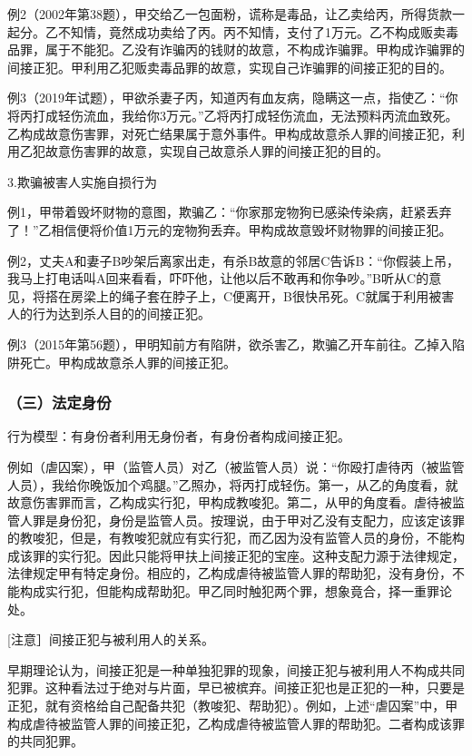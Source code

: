 例2（2002年第38题），甲交给乙一包面粉，谎称是毒品，让乙卖给丙，所得货款一起分。乙不知情，竟然成功卖给了丙。丙不知情，支付了1万元。乙不构成贩卖毒品罪，属于不能犯。乙没有诈骗丙的钱财的故意，不构成诈骗罪。甲构成诈骗罪的间接正犯。甲利用乙犯贩卖毒品罪的故意，实现自己诈骗罪的间接正犯的目的。

例3（2019年试题），甲欲杀妻子丙，知道丙有血友病，隐瞒这一点，指使乙：“你将丙打成轻伤流血，我给你3万元。”乙将丙打成轻伤流血，无法预料丙流血致死。乙构成故意伤害罪，对死亡结果属于意外事件。甲构成故意杀人罪的间接正犯，利用乙犯故意伤害罪的故意，实现自己故意杀人罪的间接正犯的目的。

3.欺骗被害人实施自损行为

例1，甲带着毁坏财物的意图，欺骗乙：“你家那宠物狗已感染传染病，赶紧丢弃了！”乙相信便将价值1万元的宠物狗丢弃。甲构成故意毁坏财物罪的间接正犯。

例2，丈夫A和妻子B吵架后离家出走，有杀B故意的邻居C告诉B：“你假装上吊，我马上打电话叫A回来看看，吓吓他，让他以后不敢再和你争吵。”B听从C的意见，将搭在房梁上的绳子套在脖子上，C便离开，B很快吊死。C就属于利用被害人的行为达到杀人目的的间接正犯。

例3（2015年第56题），甲明知前方有陷阱，欲杀害乙，欺骗乙开车前往。乙掉入陷阱死亡。甲构成故意杀人罪的间接正犯。

\subsubsection*{（三）法定身份}

行为模型：有身份者利用无身份者，有身份者构成间接正犯。

例如（虐囚案），甲（监管人员）对乙（被监管人员）说：“你殴打虐待丙（被监管人员），我给你晚饭加个鸡腿。”乙照办，将丙打成轻伤。第一，从乙的角度看，就故意伤害罪而言，乙构成实行犯，甲构成教唆犯。第二，从甲的角度看。虐待被监管人罪是身份犯，身份是监管人员。按理说，由于甲对乙没有支配力，应该定该罪的教唆犯，但是，有教唆犯就应有实行犯，而乙因为没有监管人员的身份，不能构成该罪的实行犯。因此只能将甲扶上间接正犯的宝座。这种支配力源于法律规定，法律规定甲有特定身份。相应的，乙构成虐待被监管人罪的帮助犯，没有身份，不能构成实行犯，但能构成帮助犯。甲乙同时触犯两个罪，想象竟合，择一重罪论处。

[注意］间接正犯与被利用人的关系。

早期理论认为，间接正犯是一种单独犯罪的现象，间接正犯与被利用人不构成共同犯罪。这种看法过于绝对与片面，早已被槟弃。间接正犯也是正犯的一种，只要是正犯，就有资格给自己配备共犯（教唆犯、帮助犯）。例如，上述“虐囚案”中，甲构成虐待被监管人罪的间接正犯，乙构成虐待被监管人罪的帮助犯。二者构成该罪的共同犯罪。

